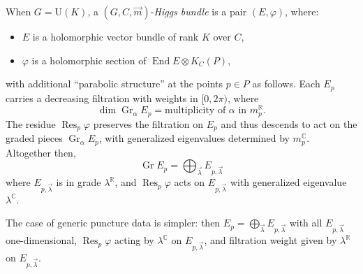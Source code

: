 \documentclass[12pt,letterpaper,reqno]{article}
\numberwithin{equation}{section}
\newcommand{\R}{\ensuremath{\mathbb R}}
\newcommand{\C}{\ensuremath{\mathbb C}}
\newcommand{\de}{\mathrm{d}}
\newcommand{\ti}[1]{\textit{#1}}
\DeclareMathOperator{\End}{End}
\DeclareMathOperator{\Res}{Res}
\DeclareMathOperator{\Gr}{Gr}
\newcommand{\SU}{\mathrm{SU}}
\newcommand{\U}{\mathrm{U}}
\begin{document}
\begin{defn}[Parabolic Higgs bundles for $G = \U(K)$]
When $G = \U(K)$, a $(G, C, \vec m)$-\ti{Higgs bundle} is a pair $(E, \varphi)$, where:
\begin{itemize}
  \item $E$ is a holomorphic vector bundle of rank $K$ over $C$,
  \item $\varphi$ is a holomorphic section of $\End E \otimes K_C(P)$,
\end{itemize}
with additional ``parabolic structure'' at the points $p \in P$
as follows. Each $E_p$ carries a decreasing filtration with weights in $[0,2\pi)$, where 
\begin{equation}
  \dim \Gr_\alpha E_p = \text{multiplicity of $\alpha$ in $m_p^\R$}.
\end{equation}
The residue $\Res_p \varphi$
preserves the filtration on $E_p$ and thus descends to
act on the graded pieces $\Gr_\alpha E_p$, with generalized
eigenvalues determined by $m_p^\C$. Altogether then,
\begin{equation}
 \Gr E_p = \bigoplus_{\vec{\lambda}} E_{p,\vec\lambda}
\end{equation}
where $E_{p,\vec\lambda}$ is in grade $\lambda^\R$, and 
$\Res_p \varphi$ acts on $E_{p,\vec\lambda}$
with generalized eigenvalue $\lambda^\C$.
\end{defn}


\begin{remark}
The case of generic puncture data is simpler:
then $E_p = \bigoplus_{\vec\lambda} E_{p,\vec\lambda}$
with all $E_{p,\vec\lambda}$ one-dimensional, $\Res_p \varphi$ 
acting by $\lambda^\C$ on $E_{p,\vec\lambda}$, and filtration weight given by $\lambda^\R$ on $E_{p,\vec\lambda}$.
\end{remark}
\end{document}
